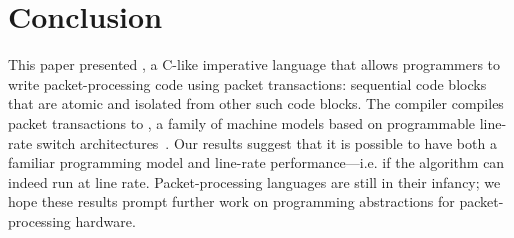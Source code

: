 \section{Conclusion}
\label{s:conclusion}

This paper presented \pktlanguage, a C-like imperative language that allows
programmers to write packet-processing code using packet transactions:
sequential code blocks that are atomic and isolated from other such code
blocks. The \pktlanguage compiler compiles packet transactions to \absmachine,
a family of machine models based on programmable line-rate switch
architectures~\cite{flexpipe, xpliant, rmt}. Our results suggest that it is
possible to have both a familiar programming model and line-rate
performance---i.e. if the algorithm can indeed run at line rate.
Packet-processing languages are still in their infancy; we hope these results
prompt further work on programming abstractions for packet-processing hardware.
